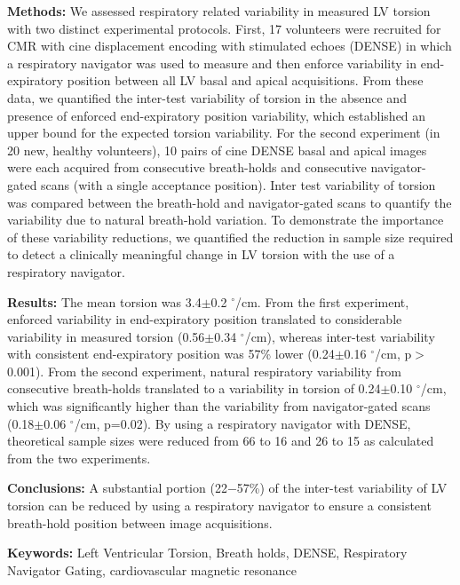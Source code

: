 	\noindent \textbf{Methods:} We assessed respiratory related variability in measured LV torsion with two distinct experimental protocols. First, 17 volunteers were recruited for CMR with cine displacement encoding with stimulated echoes (DENSE) in which a respiratory navigator was used to measure and then enforce variability in end-expiratory position between all LV basal and apical acquisitions. From these data, we quantified the inter-test variability of torsion in the absence and presence of enforced end-expiratory position variability, which established an upper bound for the expected torsion variability. For the second experiment (in 20 new, healthy volunteers), 10 pairs of cine DENSE basal and apical images were each acquired from consecutive breath-holds and consecutive navigator-gated scans (with a single acceptance position). Inter test variability of torsion was compared between the breath-hold and navigator-gated scans to quantify the variability due to natural breath-hold variation. To demonstrate the importance of these variability reductions, we quantified the reduction in sample size required to detect a clinically meaningful change in LV torsion with the use of a respiratory navigator.
	
	\noindent \textbf{Results:} The mean torsion was 3.4$\pm$0.2 $^{\circ}$/cm. From the first experiment, enforced variability in end-expiratory position translated to considerable variability in measured torsion (0.56$\pm$0.34 $^{\circ}$/cm), whereas inter-test variability with consistent end-expiratory position was 57\% lower (0.24$\pm$0.16 $^{\circ}$/cm, p$>$0.001). From the second experiment, natural respiratory variability from consecutive breath-holds translated to a variability in torsion of 0.24$\pm$0.10 $^{\circ}$/cm, which was significantly higher than the variability from navigator-gated scans (0.18$\pm$0.06 $^{\circ}$/cm, p=0.02). By using a respiratory navigator with DENSE, theoretical sample sizes were reduced from 66 to 16 and 26 to 15 as calculated from the two experiments.
	
	\noindent \textbf{Conclusions:} A substantial portion (22$-$57\%) of the inter-test variability of LV torsion can be reduced by using a respiratory navigator to ensure a consistent breath-hold position between image acquisitions.
	\bigskip
	
	\noindent \textbf{Keywords:} Left Ventricular Torsion, Breath holds, DENSE, Respiratory Navigator Gating, cardiovascular magnetic resonance\\

